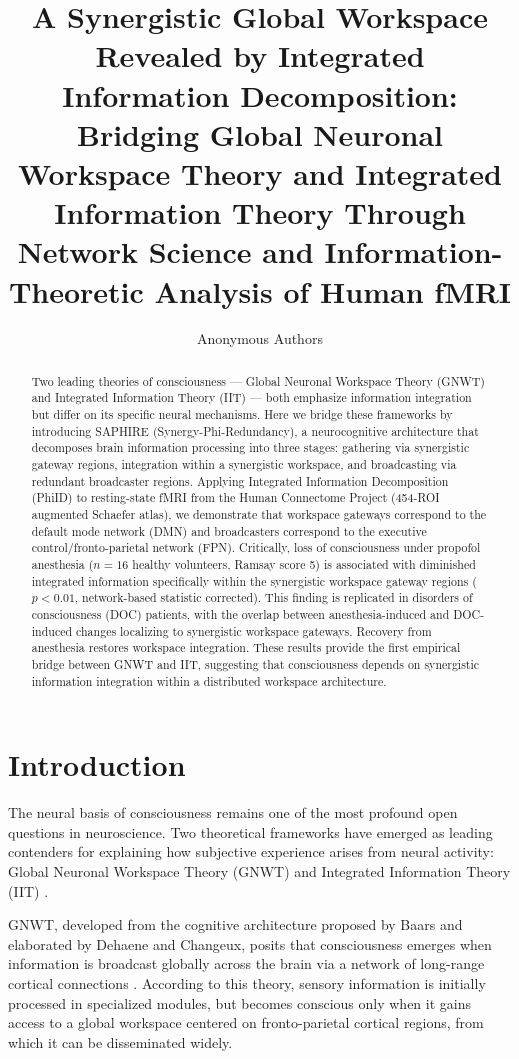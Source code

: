 \documentclass[11pt]{article}
\title{A Synergistic Global Workspace Revealed by Integrated Information Decomposition: Bridging Global Neuronal Workspace Theory and Integrated Information Theory Through Network Science and Information-Theoretic Analysis of Human fMRI}
\author{Anonymous Authors}
\date{}
\begin{document}
\maketitle

\begin{abstract}
Two leading theories of consciousness --- Global Neuronal Workspace Theory (GNWT) and Integrated Information Theory (IIT) --- both emphasize information integration but differ on its specific neural mechanisms. Here we bridge these frameworks by introducing SAPHIRE (Synergy-Phi-Redundancy), a neurocognitive architecture that decomposes brain information processing into three stages: gathering via synergistic gateway regions, integration within a synergistic workspace, and broadcasting via redundant broadcaster regions. Applying Integrated Information Decomposition (PhiID) to resting-state fMRI from the Human Connectome Project (454-ROI augmented Schaefer atlas), we demonstrate that workspace gateways correspond to the default mode network (DMN) and broadcasters correspond to the executive control/fronto-parietal network (FPN). Critically, loss of consciousness under propofol anesthesia ($n = 16$ healthy volunteers, Ramsay score 5) is associated with diminished integrated information specifically within the synergistic workspace gateway regions ($p < 0.01$, network-based statistic corrected). This finding is replicated in disorders of consciousness (DOC) patients, with the overlap between anesthesia-induced and DOC-induced changes localizing to synergistic workspace gateways. Recovery from anesthesia restores workspace integration. These results provide the first empirical bridge between GNWT and IIT, suggesting that consciousness depends on synergistic information integration within a distributed workspace architecture.
\end{abstract}

\section{Introduction}

The neural basis of consciousness remains one of the most profound open questions in neuroscience. Two theoretical frameworks have emerged as leading contenders for explaining how subjective experience arises from neural activity: Global Neuronal Workspace Theory (GNWT) and Integrated Information Theory (IIT) \citep{seth2022theories, koch2016neural}.

GNWT, developed from the cognitive architecture proposed by Baars and elaborated by Dehaene and Changeux, posits that consciousness emerges when information is broadcast globally across the brain via a network of long-range cortical connections \citep{baars1988cognitive, dehaene2011experimental, mashour2020conscious}. According to this theory, sensory information is initially processed in specialized modules, but becomes conscious only when it gains access to a global workspace centered on fronto-parietal cortical regions, from which it can be disseminated widely.
\end{document}
